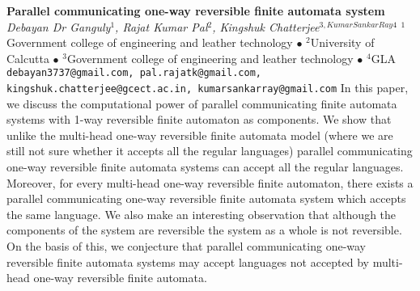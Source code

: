 
    \begin{conf-abstract}[]
        {\textbf{Parallel communicating one-way reversible finite automata system}}
        {\textit{Debayan  Dr Ganguly$^{1}$, Rajat Kumar Pal$^{2}$, Kingshuk  Chatterjee$^{3,Kumar Sankar Ray4}$}}
        {$^{1}$Government college of engineering and leather technology $\bullet$ $^{2}$University of Calcutta $\bullet$ $^{3}$Government college of engineering and leather technology $\bullet$ $^{4}$GLA}
        {\texttt{debayan3737@gmail.com, pal.rajatk@gmail.com, kingshuk.chatterjee@gcect.ac.in, kumarsankarray@gmail.com}}
        {In this paper, we discuss the computational power of parallel communicating finite automata systems with 1-way reversible finite automaton as components. We show that unlike the multi-head one-way reversible finite automata model (where we are still not sure whether it accepts all the regular languages) parallel communicating one-way reversible finite automata systems can accept all the regular languages. Moreover, for every multi-head one-way reversible finite automaton, there exists a parallel communicating one-way reversible finite automata system which accepts the same language. We also make an interesting observation that although the components of the system are reversible the system as a whole is not reversible. On the basis of this, we conjecture that parallel communicating one-way reversible finite automata systems may accept languages not accepted by multi-head one-way reversible finite automata.}
    \end{conf-abstract}
        